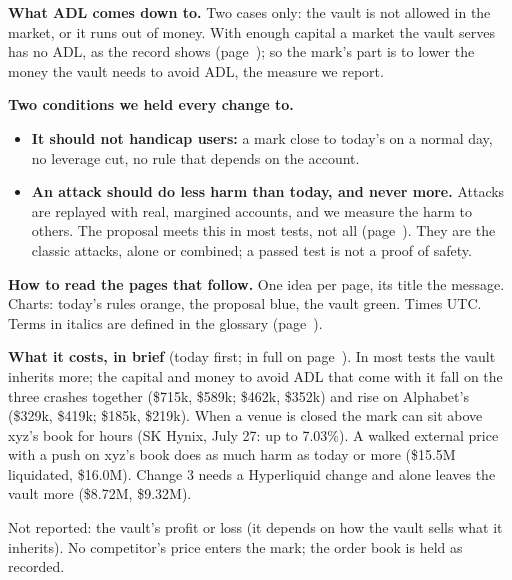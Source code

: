 \textbf{What ADL comes down to.} Two cases only: the vault is not allowed in the market, or it runs out of money. With enough capital a market the vault serves has no ADL, as the record shows (page~\pageref{sec:adl}); so the mark's part is to lower the money the vault needs to avoid ADL, the measure we report.

\textbf{Two conditions we held every change to.}
\begin{itemize}[leftmargin=1.3em,itemsep=.4ex,topsep=.3ex]
\item \textbf{It should not handicap users:} a mark close to today's on a normal day, no leverage cut, no rule that depends on the account.
\item \textbf{An attack should do less harm than today, and never more.} Attacks are replayed with real, margined accounts, and we measure the harm to others. The proposal meets this in most tests, not all (page~\pageref{sec:costs}). They are the classic attacks, alone or combined; a passed test is not a proof of safety.
\end{itemize}

\vspace{1ex}
\textbf{How to read the pages that follow.} One idea per page, its title the message. Charts: today's rules orange, the proposal blue, the vault green. Times UTC. Terms in italics are defined in the glossary (page~\pageref{sec:glossary}).

\textbf{What it costs, in brief} (today first; in full on page~\pageref{sec:costs}). In most tests the vault inherits more; the capital and money to avoid ADL that come with it fall on the three crashes together (\$715k, \$589k; \$462k, \$352k) and rise on Alphabet's (\$329k, \$419k; \$185k, \$219k). When a venue is closed the mark can sit above xyz's book for hours (SK Hynix, July 27: up to 7.03\%). A walked external price with a push on xyz's book does as much harm as today or more (\$15.5M liquidated, \$16.0M). Change 3 needs a Hyperliquid change and alone leaves the vault more (\$8.72M, \$9.32M).

\par{\small\color{mute}Not reported: the vault's profit or loss (it depends on how the vault sells what it inherits). No competitor's price enters the mark; the order book is held as recorded.\par}

\label{sec:formulas}

